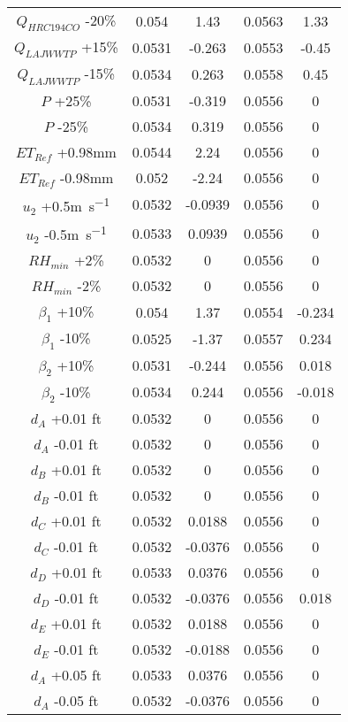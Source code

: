 \begin{spacing}{1.0}
\begin{center}
\begin{longtable}{ccccc}
			$Q_{HRC194CO} $ -20\% & 0.054 & 1.43 & 0.0563 & 1.33 \\
			$Q_{LAJWWTP} $ +15\% & 0.0531 & -0.263 & 0.0553 & -0.45 \\
			$Q_{LAJWWTP} $ -15\% & 0.0534 & 0.263 & 0.0558 & 0.45 \\
			$P$ +25\% & 0.0531 & -0.319 & 0.0556 & 0 \\
			$P$ -25\% & 0.0534 & 0.319 & 0.0556 & 0 \\
			$ET_{Ref}$ +0.98\si{\milli\meter} & 0.0544 & 2.24 & 0.0556 & 0 \\
			$ET_{Ref}$ -0.98\si{\milli\meter} & 0.052 & -2.24 & 0.0556 & 0 \\
			$u_{2} $ +0.5\si{\meter\per\second} & 0.0532 & -0.0939 & 0.0556 & 0 \\
			$u_{2} $ -0.5\si{\meter\per\second} & 0.0533 & 0.0939 & 0.0556 & 0 \\
			$RH_{min} $ +2\% & 0.0532 & 0 & 0.0556 & 0 \\
			$RH_{min} $ -2\% & 0.0532 & 0 & 0.0556 & 0 \\
			$\beta_{1} $ +10\% & 0.054 & 1.37 & 0.0554 & -0.234 \\
			$\beta_{1} $ -10\% & 0.0525 & -1.37 & 0.0557 & 0.234 \\
			$\beta_{2} $ +10\% & 0.0531 & -0.244 & 0.0556 & 0.018 \\
			$\beta_{2} $ -10\% & 0.0534 & 0.244 & 0.0556 & -0.018 \\
			$d_{A} $ +0.01 ft & 0.0532 & 0 & 0.0556 & 0 \\
			$d_{A} $ -0.01 ft & 0.0532 & 0 & 0.0556 & 0 \\
			$d_{B} $ +0.01 ft & 0.0532 & 0 & 0.0556 & 0 \\
			$d_{B} $ -0.01 ft & 0.0532 & 0 & 0.0556 & 0 \\
			$d_{C} $ +0.01 ft & 0.0532 & 0.0188 & 0.0556 & 0 \\
			$d_{C} $ -0.01 ft & 0.0532 & -0.0376 & 0.0556 & 0 \\
			$d_{D} $ +0.01 ft & 0.0533 & 0.0376 & 0.0556 & 0 \\
			$d_{D} $ -0.01 ft & 0.0532 & -0.0376 & 0.0556 & 0.018 \\
			$d_{E} $ +0.01 ft & 0.0532 & 0.0188 & 0.0556 & 0 \\
			$d_{E} $ -0.01 ft & 0.0532 & -0.0188 & 0.0556 & 0 \\
			$d_{A} $ +0.05 ft & 0.0533 & 0.0376 & 0.0556 & 0 \\
			$d_{A} $ -0.05 ft & 0.0532 & -0.0376 & 0.0556 & 0 \\

\end{longtable}
\end{center}
\end{spacing}

